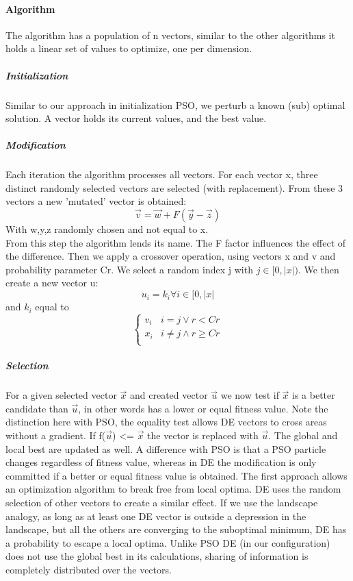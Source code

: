 \paragraph{Algorithm}
The algorithm has a population of n vectors, similar to the other algorithms it holds a linear set of values to optimize, one per dimension.  
\subparagraph{Initialization}
Similar to our approach in initialization PSO, we perturb a known (sub) optimal solution. A vector holds its current values, and the best value. 
\subparagraph{Modification}
Each iteration the algorithm processes all vectors. For each vector x, three distinct randomly selected vectors are selected (with replacement). From these 3 vectors a new 'mutated' vector is obtained:
\[
\vec{v} = \vec{w} + F (\vec{y} - \vec{z})
\]
With w,y,z randomly chosen and not equal to x.\\
From this step the algorithm lends its name. The F factor influences the effect of the difference. 
Then we apply a crossover operation, using vectors x and v and probability parameter Cr.
We select a random index j with $ j \in [0, \vert x \vert)$. We then create a new vector u:
\[
u_i = k_i \forall i \in [0, \vert x \vert
\]
and $k_i$ equal to 
\[   \left\{
\begin{array}{ll}
      v_i & i = j \lor r < Cr \\
      x_i & i \neq j \land r \geq Cr \\
\end{array} 
\right.
\]
\subparagraph{Selection}
For a given selected vector $\vec{x}$ and created vector $\vec{u}$ we now test if $\vec{x}$ is a better candidate than $\vec{u}$, in other words has a lower or equal fitness value. Note the distinction here with PSO, the equality test allows DE vectors to cross areas without a gradient. If f($\vec{u}$) <= $\vec{x}$ the vector is replaced with $\vec{u}$. The global and local best are updated as well. A difference with PSO is that a PSO particle changes regardless of fitness value, whereas in DE the modification is only committed if a better or equal fitness value is obtained. The first approach allows an optimization algorithm to break free from local optima. DE uses the random selection of other vectors to create a similar effect. If we use the landscape analogy, as long as at least one DE vector is outside a depression in the landscape, but all the others are converging to the suboptimal minimum, DE has a probability to escape a local optima. Unlike PSO DE (in our configuration) does not use the global best in its calculations, sharing of information is completely distributed over the vectors.
